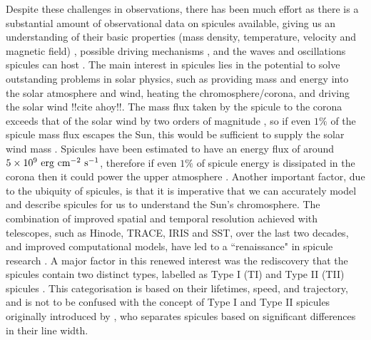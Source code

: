 \documentclass[12pt]{ociamthesis}
\newcommand{\np}{\\ \\}
\begin{document}
Despite these challenges in observations, there has been much effort as there is a substantial amount of observational data on spicules available, giving us an understanding of their basic properties (mass density, temperature, velocity and magnetic field) \citep[see reviews:][]{Beckers1968, Beckers1972ARA&A}, possible driving mechanisms \citep[see review:][]{Sterling_2000SoPh}, and the waves and oscillations spicules can host \citep[see review:][]{Zaqarashvili_2009SSRv}. The main interest in spicules lies in the potential to solve outstanding problems in solar physics, such as providing mass and energy into the solar atmosphere and wind, heating the chromosphere/corona, and driving the solar wind \citep{Pontieu2011Sci, Moore2011ApJ731L18M, Henriques2016, Samanta2019Sci} {\color{green} !!cite ahoy!!}. The mass flux taken by the spicule to the corona exceeds that of the solar wind by two orders of magnitude \citep{Thomas1961}, so if even $1\%$ of the spicule mass flux escapes the Sun, this would be sufficient to supply the solar wind mass \citep{Pneuman1977AA55305P, Pneuman1978SoPh5749P, Tian2014Sci346A315T, Samanta2015ApJ815L16S}. Spicules have been estimated to have an energy flux of around $5\times10^9~\rm{erg~cm^{-2}~s^{-1}}$, therefore if even $1\%$ of spicule energy is dissipated in the corona then it could power the upper atmosphere \citep{Zaqarashvili_2009SSRv}. Another important factor, due to the ubiquity of spicules, is that it is imperative that we can accurately model and describe spicules for us to understand the Sun's chromosphere. The combination of improved spatial and temporal resolution achieved with telescopes, such as Hinode, TRACE, IRIS and SST, over the last two decades, and improved computational models, have led to a ``renaissance" in spicule research \citep{Aschwanden2019ASSL}. A major factor in this renewed interest was the rediscovery that the spicules contain two distinct types, labelled as Type I (TI) and Type II (TII) spicules \citep{Pontieu2007PASJ}. This categorisation is based on their lifetimes, speed, and trajectory, and is not to be confused with the concept of Type I and Type II spicules originally introduced by \cite{Beckers1968}, who separates spicules based on significant differences in their line width. \np
\end{document}
